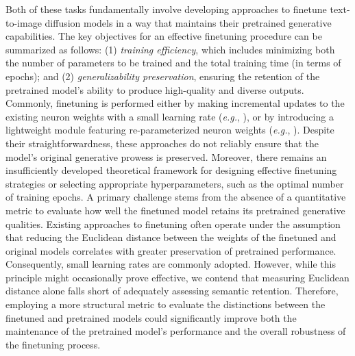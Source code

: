 Both of these tasks fundamentally involve developing approaches to finetune text-to-image diffusion models in a way that maintains their pretrained generative capabilities. The key objectives for an effective finetuning procedure can be summarized as follows: (1) \emph{training efficiency}, which includes minimizing both the number of parameters to be trained and the total training time (in terms of epochs); and (2) \emph{generalizability preservation}, ensuring the retention of the pretrained model's ability to produce high-quality and diverse outputs. Commonly, finetuning is performed either by making incremental updates to the existing neuron weights with a small learning rate (\emph{e.g.}, \cite{ruiz2023dreambooth}), or by introducing a lightweight module featuring re-parameterized neuron weights (\emph{e.g.}, \cite{hulora2022,zhang2023adding}). Despite their straightforwardness, these approaches do not reliably ensure that the model's original generative prowess is preserved. Moreover, there remains an insufficiently developed theoretical framework for designing effective finetuning strategies or selecting appropriate hyperparameters, such as the optimal number of training epochs. A primary challenge stems from the absence of a quantitative metric to evaluate how well the finetuned model retains its pretrained generative qualities. Existing approaches to finetuning often operate under the assumption that reducing the Euclidean distance between the weights of the finetuned and original models correlates with greater preservation of pretrained performance. Consequently, small learning rates are commonly adopted. However, while this principle might occasionally prove effective, we contend that measuring Euclidean distance alone falls short of adequately assessing semantic retention. Therefore, employing a more structural metric to evaluate the distinctions between the finetuned and pretrained models could significantly improve both the maintenance of the pretrained model's performance and the overall robustness of the finetuning process.

